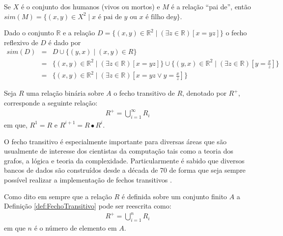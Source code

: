 \begin{example}
	Se $X$ é o conjunto dos humanos (vivos ou mortos) e $M$ é a relação ``pai de'', então $sim(M) = \{(x, y) \in X^2 \mid x \text{ é pai de } y \text{ ou } x \text{ é filho de} y\}$.
\end{example}

\begin{example}
	Dado o conjunto $\mathbb{R}$ e a relação $D = \{(x,y) \in \mathbb{R}^2 \mid (\exists z \in \mathbb{R})[x = yz]\}$ o fecho reflexivo de $D$ é dado por
	\begin{eqnarray*}
		sim(D) & = &   D \cup \{(y, x) \mid (x, y) \in R\}\\
		& = & \{(x,y) \in \mathbb{R}^2 \mid (\exists z \in \mathbb{R})[x = yz]\} \cup \{(y, x) \in \mathbb{R}^2 \mid (\exists z \in \mathbb{R})[y = \frac{x}{z}]\}\\
		& = & \{(x,y) \in \mathbb{R}^2 \mid (\exists z \in \mathbb{R})[x = yz \lor y = \frac{x}{z}]\}
	\end{eqnarray*}
\end{example}

\begin{definition}\label{def:FechoTransitivo}
	Seja $R$ uma relação binária sobre $A$ o fecho transitivo de $R$, denotado por $R^+$, corresponde a seguinte relação:
	\begin{eqnarray*}
		R^+ = \bigcup_{i = 1}^\infty R_i
	\end{eqnarray*}
	em que, $R^1 = R$ e $R^{i+1} = R \bullet R^i$.
\end{definition}

O fecho transitivo é especialmente importante para diversas áreas que são usualmente de interesse dos cientistas da computação tais como a teoria dos grafos, a lógica e teoria da complexidade. Particularmente é sabido que diversos bancos de dados são construídos desde a década de 70 de forma que seja sempre possível realizar a implementação de fechos transitivos \cite{Gerard2021discreta}.

\begin{remark}
	Como dito em \cite{carmo2013} sempre que a relação $R$ é definida sobre um conjunto finito $A$ a Definição \ref{def:FechoTransitivo} pode ser reescrita como:
	\begin{eqnarray*}
		R^+ = \bigcup_{i = 1}^n R_i
	\end{eqnarray*}
	em que $n$ é o número de elemento em $A$.
\end{remark}


